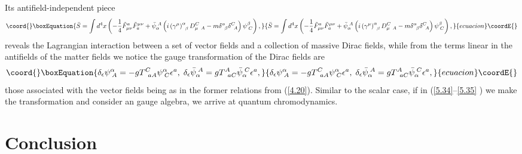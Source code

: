 \documentclass[a4paper,12pt]{article}
\begin{document}
Its antifield-independent piece
\begin{equation}\coord{}\boxEquation{
\bar{S}=\int d^{4}x\left( -
\frac{1}{4}\tilde{F}_{\mu \nu }^{a}\tilde{F}
_{a}^{\mu \nu }+
\bar{\psi}_{\alpha }^{\;A}\left( i\left( \gamma ^{\mu
}\right) _{\;\;\beta }^{\alpha }D_{\mu \;\;A}^{C}-
m\delta _{\;\;\beta
}^{\alpha }\delta _{\;\;A}^{C}\right)
\psi _{\;C}^{\beta }\right) ,
\label{5.34}
}{
\bar{S}=\int d^{4}x\left( -
\frac{1}{4}\tilde{F}_{\mu \nu }^{a}\tilde{F}
_{a}^{\mu \nu }+
\bar{\psi}_{\alpha }^{\;A}\left( i\left( \gamma ^{\mu
}\right) _{\;\;\beta }^{\alpha }D_{\mu \;\;A}^{C}-
m\delta _{\;\;\beta
}^{\alpha }\delta _{\;\;A}^{C}\right)
\psi _{\;C}^{\beta }\right) ,
}{ecuacion}\coordE{}\end{equation}
reveals the Lagrangian interaction
between a set of vector fields and a
collection of massive Dirac fields,
while from the terms linear in the
antifields of the matter fields we
notice the gauge transformation of the
Dirac fields are
\begin{equation}\coord{}\boxEquation{
\delta _{\epsilon }\psi _{\;A}^{\alpha }=
-gT_{\;\;aA}^{C}\psi _{\;C}^{\alpha
}\epsilon ^{a},\;\delta _{\epsilon }
\bar{\psi}_{\alpha
}^{\;A}=gT_{\;\;aC}^{A}
\bar{\psi}_{\alpha }^{\;C}\epsilon ^{a},  \label{5.35}
}{
\delta _{\epsilon }\psi _{\;A}^{\alpha }=
-gT_{\;\;aA}^{C}\psi _{\;C}^{\alpha
}\epsilon ^{a},\;\delta _{\epsilon }
\bar{\psi}_{\alpha
}^{\;A}=gT_{\;\;aC}^{A}
\bar{\psi}_{\alpha }^{\;C}\epsilon ^{a},  }{ecuacion}\coordE{}\end{equation}
those associated with the vector
fields being as in the former relations
from (\ref{4.20}). Similar to the
scalar case, if in (\ref{5.34}--\ref{5.35}%
) we make the transformation
\coordHE{} and
consider an \coordHE{}
gauge algebra, we arrive at quantum
chromodynamics.

\section{Conclusion}
\end{document}
